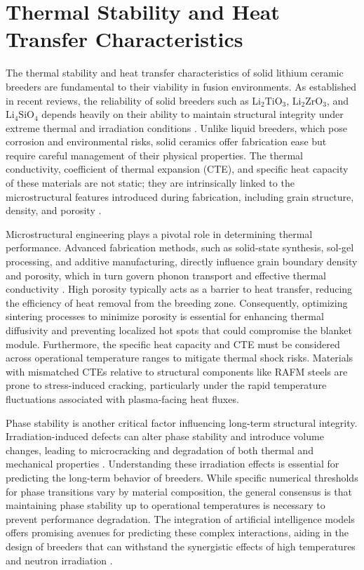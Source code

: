 \documentclass[review,12pt,a4paper]{elsarticle}
\begin{document}
\section{Thermal Stability and Heat Transfer Characteristics}


\textcolor{medconf}{The thermal stability and heat transfer characteristics of solid lithium ceramic breeders are fundamental to their viability in fusion environments. As established in recent reviews, the reliability of solid breeders such as $\mathrm{Li}_2\mathrm{TiO}_3$, $\mathrm{Li}_2\mathrm{ZrO}_3$, and $\mathrm{Li}_4\mathrm{SiO}_4$ depends heavily on their ability to maintain structural integrity under extreme thermal and irradiation conditions \citep{ruegsegger_scoping_2023}. Unlike liquid breeders, which pose corrosion and environmental risks, solid ceramics offer fabrication ease but require careful management of their physical properties. The thermal conductivity, coefficient of thermal expansion (CTE), and specific heat capacity of these materials are not static; they are intrinsically linked to the microstructural features introduced during fabrication, including grain structure, density, and porosity \citep{ruegsegger_scoping_2023}.}

\textcolor{medconf}{Microstructural engineering plays a pivotal role in determining thermal performance. Advanced fabrication methods, such as solid-state synthesis, sol-gel processing, and additive manufacturing, directly influence grain boundary density and porosity, which in turn govern phonon transport and effective thermal conductivity \citep{ruegsegger_scoping_2023}. High porosity typically acts as a barrier to heat transfer, reducing the efficiency of heat removal from the breeding zone. Consequently, optimizing sintering processes to minimize porosity is essential for enhancing thermal diffusivity and preventing localized hot spots that could compromise the blanket module. Furthermore, the specific heat capacity and CTE must be considered across operational temperature ranges to mitigate thermal shock risks. Materials with mismatched CTEs relative to structural components like RAFM steels are prone to stress-induced cracking, particularly under the rapid temperature fluctuations associated with plasma-facing heat fluxes.}

\textcolor{medconf}{Phase stability is another critical factor influencing long-term structural integrity. Irradiation-induced defects can alter phase stability and introduce volume changes, leading to microcracking and degradation of both thermal and mechanical properties \citep{ruegsegger_scoping_2023}. Understanding these irradiation effects is essential for predicting the long-term behavior of breeders. While specific numerical thresholds for phase transitions vary by material composition, the general consensus is that maintaining phase stability up to operational temperatures is necessary to prevent performance degradation. The integration of artificial intelligence models offers promising avenues for predicting these complex interactions, aiding in the design of breeders that can withstand the synergistic effects of high temperatures and neutron irradiation \citep{ruegsegger_scoping_2023}.}
\end{document}
